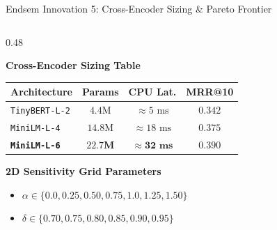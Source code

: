 \documentclass[10pt,aspectratio=169]{beamer}
\begin{document}
\begin{frame}{Endsem Innovation 5: Cross-Encoder Sizing \& Pareto Frontier}
    \begin{columns}[onlytextwidth,T]
        \begin{column}{0.48\textwidth}
            \begin{block}{\textbf{Cross-Encoder Sizing Table}}
                \scriptsize
                \begin{tabular}{lccc}
                    \toprule
                    \textbf{Architecture} & \textbf{Params} & \textbf{CPU Lat.} & \textbf{MRR@10} \\
                    \midrule
                    \texttt{TinyBERT-L-2} & $4.4\text{M}$ & $\approx 5\text{ ms}$ & $0.342$ \\
                    \texttt{MiniLM-L-4} & $14.8\text{M}$ & $\approx 18\text{ ms}$ & $0.375$ \\
                    \textbf{\texttt{MiniLM-L-6}} & $\mathbf{22.7\text{M}}$ & $\mathbf{\approx 32\text{ ms}}$ & $\mathbf{0.390}$ \\
                    \bottomrule
                \end{tabular}
            \end{block}
            
            \begin{block}{\textbf{2D Sensitivity Grid Parameters}}
                \begin{itemize}\setlength\itemsep{1pt}
                    \item $\alpha \in \{0.0, 0.25, 0.50, 0.75, 1.0, 1.25, 1.50\}$
                    \item $\delta \in \{0.70, 0.75, 0.80, 0.85, 0.90, 0.95\}$
                \end{itemize}
            \end{block}
        \end{column}
        

\end{columns}
\end{frame}
\end{document}
